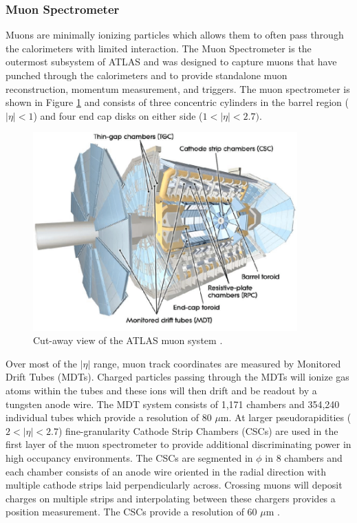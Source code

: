 \subsubsection{Muon Spectrometer}
Muons are minimally ionizing particles which allows them to often pass through the calorimeters with limited interaction. The Muon Spectrometer is the outermost subsystem of ATLAS and was designed to capture muons that have punched through the calorimeters and to provide standalone muon reconstruction, momentum measurement, and triggers. The muon spectrometer is shown in Figure \ref{fig:muon_sys} and consists of three concentric cylinders in the barrel region ($|\eta|<1$) and four end cap disks on either side ($1<|\eta|<2.7)$\cite{muon_tdr}.\\

\begin{figure}[h]
    \centering
    \includegraphics[width=4in]{figures/chapter2/muon_sys.png}
    \caption{Cut-away view of the ATLAS muon system \cite{atlas}.}
    \label{fig:muon_sys}
\end{figure}

Over most of the $|\eta|$ range, muon track coordinates are measured by Monitored Drift Tubes (MDTs). Charged particles passing through the MDTs will ionize gas atoms within the tubes and these ions will then drift and be readout by a tungsten anode wire. The MDT system consists of 1,171 chambers and 354,240 individual tubes which provide a resolution of 80 $\mu$m. At larger pseudorapidities ($2<|\eta|<2.7$) fine-granularity Cathode Strip Chambers (CSCs) are used in the first layer of the muon spectrometer to provide additional discriminating power in high occupancy environments. The CSCs are segmented in $\phi$ in 8 chambers and each chamber consists of an anode wire oriented in the radial direction with multiple cathode strips laid perpendicularly across. Crossing muons will deposit charges on multiple strips and interpolating between these chargers provides a position measurement. The CSCs provide a resolution of 60 $\mu$m \cite{muon_tdr}.\\

